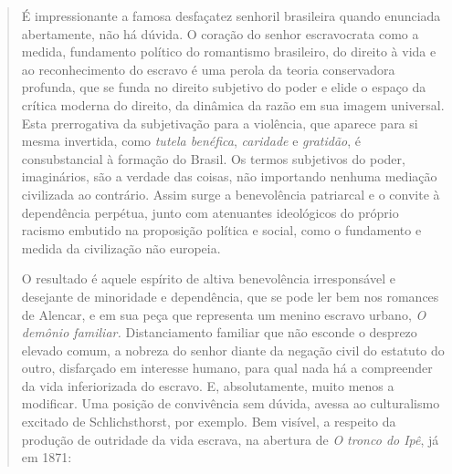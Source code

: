 \begin{quote}
É impressionante a famosa desfaçatez senhoril brasileira quando
enunciada abertamente, não há dúvida. O coração do senhor escravocrata
como a medida, fundamento político do romantismo brasileiro, do direito
à vida e ao reconhecimento do escravo é uma perola da teoria
conservadora profunda, que se funda no direito subjetivo do poder e
elide o espaço da crítica moderna do direito, da dinâmica da razão em
sua imagem universal. Esta prerrogativa da subjetivação para a
violência, que aparece para si mesma invertida, como \emph{tutela
benéfica}, \emph{caridade} e \emph{gratidão}, é consubstancial à
formação do Brasil. Os termos subjetivos do poder, imaginários, são a
verdade das coisas, não importando nenhuma mediação civilizada ao
contrário. Assim surge a benevolência patriarcal e o convite à
dependência perpétua, junto com atenuantes ideológicos do próprio
racismo embutido na proposição política e social, como o fundamento e
medida da civilização não europeia.

O resultado é aquele espírito de altiva benevolência irresponsável e
desejante de minoridade e dependência, que se pode ler bem nos romances
de Alencar, e em sua peça que representa um menino escravo urbano,
\emph{O demônio familiar.} Distanciamento familiar que não esconde o
desprezo elevado comum, a nobreza do senhor diante da negação civil do
estatuto do outro, disfarçado em interesse humano, para qual nada há a
compreender da vida inferiorizada do escravo. E, absolutamente, muito
menos a modificar. Uma posição de convivência sem dúvida, avessa ao
culturalismo excitado de Schlichsthorst, por exemplo. Bem visível, a
respeito da produção de outridade da vida escrava, na abertura de
\emph{O tronco do Ipê}, já em 1871:


\end{quote}
